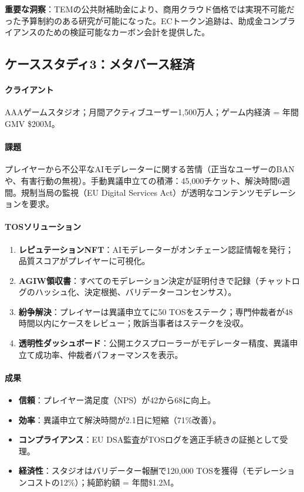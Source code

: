\documentclass[11pt]{article}
\begin{document}
\textbf{重要な洞察}：TEMの公共財補助金により、商用クラウド価格では実現不可能だった予算制約のある研究が可能になった。ECトークン追跡は、助成金コンプライアンスのための検証可能なカーボン会計を提供した。

\subsection{ケーススタディ3：メタバース経済}

\paragraph{クライアント} AAAゲームスタジオ；月間アクティブユーザー1,500万人；ゲーム内経済 = 年間GMV \$200M。

\paragraph{課題} プレイヤーから不公平なAIモデレーターに関する苦情（正当なユーザーのBANや、有害行動の無視）。手動異議申立ての積滞：45,000チケット、解決時間6週間。規制当局の監視（EU Digital Services Act）が透明なコンテンツモデレーションを要求。

\paragraph{TOSソリューション}
\begin{enumerate}[noitemsep]
  \item \textbf{レピュテーションNFT}：AIモデレーターがオンチェーン認証情報を発行；品質スコアがプレイヤーに可視化。
  \item \textbf{AGIW領収書}：すべてのモデレーション決定が証明付きで記録（チャットログのハッシュ化、決定根拠、バリデーターコンセンサス）。
  \item \textbf{紛争解決}：プレイヤーは異議申立てに50 TOSをステーク；専門仲裁者が48時間以内にケースをレビュー；敗訴当事者はステークを没収。
  \item \textbf{透明性ダッシュボード}：公開エクスプローラーがモデレーター精度、異議申立て成功率、仲裁者パフォーマンスを表示。
\end{enumerate}

\paragraph{成果}
\begin{itemize}[noitemsep]
  \item \textbf{信頼}：プレイヤー満足度（NPS）が42から68に向上。
  \item \textbf{効率}：異議申立て解決時間が2.1日に短縮（71\%改善）。
  \item \textbf{コンプライアンス}：EU DSA監査がTOSログを適正手続きの証拠として受理。
  \item \textbf{経済性}：スタジオはバリデーター報酬で120,000 TOSを獲得（モデレーションコストの12\%）；純節約額 = 年間\$1.2M。
\end{itemize}
\end{document}
